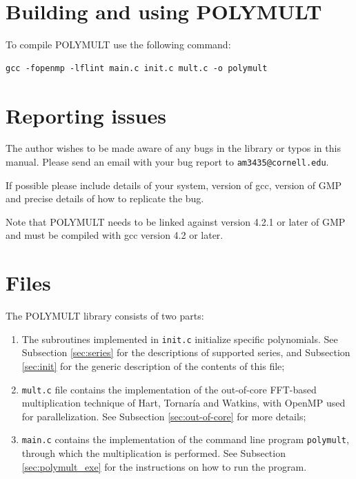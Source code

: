 \documentclass[a4paper,10pt]{article}
\newcommand{\code}{\lstinline}
\begin{document}
\section{Building and using POLYMULT}

To compile POLYMULT use the following command:

\begin{verbatim}
gcc -fopenmp -lflint main.c init.c mult.c -o polymult
\end{verbatim}




\section{Reporting issues}

The author wishes to be made aware of any bugs in the library or typos in this manual. Please send an email with your bug report to \code{am3435@cornell.edu}.

If possible please include details of your system, version of gcc, version of GMP and precise details of how to replicate the bug.

Note that POLYMULT needs to be linked against version 4.2.1 or later of GMP and must be compiled with gcc version 4.2 or later.





\section{Files}

The POLYMULT library consists of two parts:

\begin{enumerate}
\item The subroutines implemented in \code{init.c} initialize specific polynomials. See Subsection \ref{sec:series} for the descriptions of supported series, and Subsection \ref{sec:init} for the generic description of the contents of this file;

\item \code{mult.c} file contains the implementation of the out-of-core FFT-based multiplication technique of Hart, Tornar\'ia and Watkins, with OpenMP used for parallelization. See Subsection \ref{sec:out-of-core} for more details;

\item \code{main.c} contains the implementation of the command line program \code{polymult}, through which the multiplication is performed. See Subsection \ref{sec:polymult_exe} for the instructions on how to run the program.
\end{enumerate}
\end{document}
